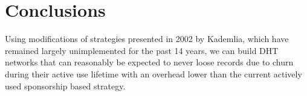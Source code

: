 \documentclass[conference]{IEEEtran}
\begin{document}
\section{Conclusions}

Using modifications of strategies presented in 2002 by Kademlia\cite{kademlia}, which have remained largely unimplemented for the past 14 years, we can build DHT networks that can reasonably be expected to never loose records due to churn during their active use lifetime with an overhead lower than the current actively used sponsorship based strategy.



\end{document}
